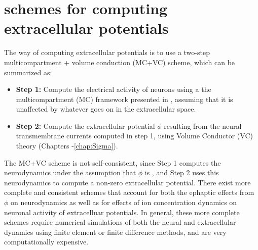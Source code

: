 \chapter{ schemes for computing extracellular potentials}
\label{sec:LFPy}


The  way of computing extracellular potentials is to use a two-step multicompartment + volume conduction (MC+VC) scheme,
which can be summarized as:

\begin{itemize}
\item {\bf Step 1:} Compute the electrical activity of neurons using a the multicompartment (MC) framework presented in , assuming that it is unaffected by whatever goes on in the extracellular space.
\item {\bf Step 2:} Compute the extracellular potential $\phi$ resulting from the neural transmembrane currents computed in step 1, using Volume Conductor (VC) theory (Chapters -\ref{chap:Sigma}). 
\end{itemize}

The MC+VC scheme is not self-consistent, since Step 1 computes the neurodynamics under the assumption that $\phi$ is ,
and Step 2 uses this neurodynamics to compute a non-zero extracellular potential.
There exist more complete and consistent schemes that account for both the ephaptic effects from $\phi$ on neurodynamics as well as for effects of ion concentration dynamics on neuronal activity of extracelluar potentials. In general, these more complete schemes require numerical simulations of both the neural and extracellular dynamics using finite element or finite difference methods, and are very computationally expensive.

